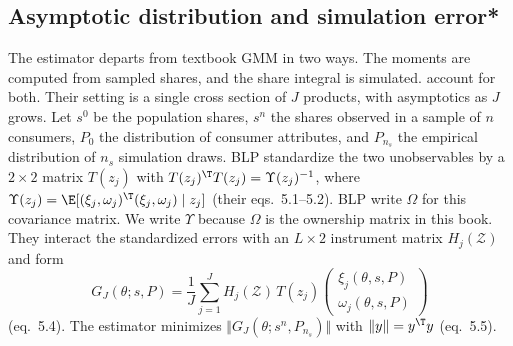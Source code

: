 \subsection{Asymptotic distribution and simulation error*}\label{sec:08-asymptotics}

The estimator departs from textbook GMM in two ways. The moments are computed from sampled shares, and the
share integral is simulated. \citet[Section 5]{BerryLevinsohnPakes1995} account for both. Their setting is a
single cross section of $J$ products, with asymptotics as $J$ grows. Let $s^0$ be the population shares,
$s^n$ the shares observed in a sample of $n$ consumers, $P_0$ the distribution of consumer attributes, and
$P_{n_s}$ the empirical distribution of $n_s$ simulation draws. BLP standardize the two unobservables by a
$2 \times 2$ matrix $T(z_j)$ with $T(z_j)^\T T(z_j) = \Upsilon(z_j)^{-1}$, where $\Upsilon(z_j) =
\E[(\xi_j, \omega_j)^\T(\xi_j, \omega_j) \mid z_j]$ (their eqs.~5.1--5.2). BLP write $\Omega$ for this covariance matrix. We write $\Upsilon$ because $\Omega$ is the ownership matrix in this book. They interact the standardized
errors with an $L \times 2$ instrument matrix $H_j(\mathcal Z)$ and form
\begin{equation*}
  G_J(\theta; s, P) = \frac{1}{J}\sum_{j=1}^{J}H_j(\mathcal{Z})\,T(z_j)\begin{pmatrix}\xi_j(\theta, s,
  P)\\ \omega_j(\theta, s, P)\end{pmatrix}
\end{equation*}
(eq.~5.4). The estimator minimizes $\Vert G_J(\theta; s^n, P_{n_s})\Vert$ with $\Vert y\Vert = y^\T y$
(eq.~5.5).

